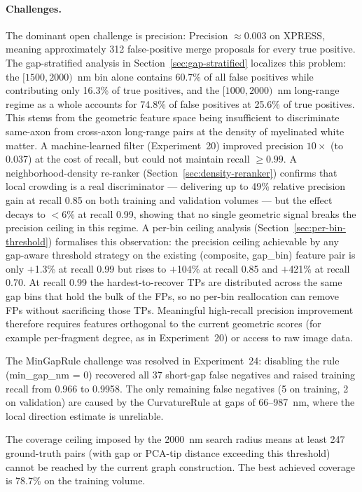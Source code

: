 \paragraph{Challenges.}
The dominant open challenge is precision: Precision $\approx 0.003$ on XPRESS,
meaning approximately 312 false-positive merge proposals for every true positive.
The gap-stratified analysis in Section~\ref{sec:gap-stratified} localizes
this problem: the $[1500, 2000)$~nm bin alone contains 60.7\% of all false
positives while contributing only 16.3\% of true positives, and the
$[1000, 2000)$~nm long-range regime as a whole accounts for 74.8\% of
false positives at 25.6\% of true positives.  This stems from the geometric
feature space being insufficient to discriminate same-axon from cross-axon
long-range pairs at the density of myelinated white matter.  A machine-learned
filter (Experiment~20) improved precision $10\times$ (to 0.037) at the cost
of recall, but could not maintain recall $\geq 0.99$.  A neighborhood-density
re-ranker (Section~\ref{sec:density-reranker}) confirms that local crowding
is a real discriminator --- delivering up to 49\% relative precision gain at
recall 0.85 on both training and validation volumes --- but the effect
decays to $<$6\% at recall 0.99, showing that no single geometric signal
breaks the precision ceiling in this regime.  A per-bin ceiling analysis
(Section~\ref{sec:per-bin-threshold}) formalises this observation:
the precision ceiling achievable by any gap-aware threshold strategy
on the existing (composite, gap\_bin) feature pair is only $+$1.3\% at
recall 0.99 but rises to $+$104\% at recall 0.85 and $+$421\% at recall
0.70.  At recall 0.99 the hardest-to-recover TPs are distributed across
the same gap bins that hold the bulk of the FPs, so no per-bin
reallocation can remove FPs without sacrificing those TPs.  Meaningful
high-recall precision improvement therefore requires features
orthogonal to the current geometric scores (for example per-fragment
degree, as in Experiment~20) or access to raw image data.

The MinGapRule challenge was resolved in Experiment~24: disabling the rule
(min\_gap\_nm = 0) recovered all 37 short-gap false negatives and raised
training recall from 0.966 to 0.9958. The only remaining false negatives
(5 on training, 2 on validation) are caused by the CurvatureRule at gaps of
66--987~nm, where the local direction estimate is unreliable.

The coverage ceiling imposed by the 2000~nm search radius means at least 247
ground-truth pairs (with gap or PCA-tip distance exceeding this threshold)
cannot be reached by the current graph construction. The best achieved coverage
is 78.7\% on the training volume.

